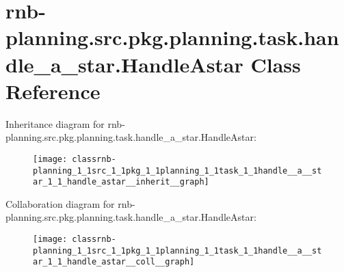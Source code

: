 \hypertarget{classrnb-planning_1_1src_1_1pkg_1_1planning_1_1task_1_1handle__a__star_1_1_handle_astar}{}\section{rnb-\/planning.src.\+pkg.\+planning.\+task.\+handle\+\_\+a\+\_\+star.\+Handle\+Astar Class Reference}
\label{classrnb-planning_1_1src_1_1pkg_1_1planning_1_1task_1_1handle__a__star_1_1_handle_astar}


Inheritance diagram for rnb-\/planning.src.\+pkg.\+planning.\+task.\+handle\+\_\+a\+\_\+star.\+Handle\+Astar\+:\nopagebreak
\begin{figure}[H]
\begin{center}
\leavevmode
\texttt{[image: classrnb-planning\_1\_1src\_1\_1pkg\_1\_1planning\_1\_1task\_1\_1handle\_\_a\_\_star\_1\_1\_handle\_astar\_\_inherit\_\_graph]}
\end{center}
\end{figure}


Collaboration diagram for rnb-\/planning.src.\+pkg.\+planning.\+task.\+handle\+\_\+a\+\_\+star.\+Handle\+Astar\+:\nopagebreak
\begin{figure}[H]
\begin{center}
\leavevmode
\texttt{[image: classrnb-planning\_1\_1src\_1\_1pkg\_1\_1planning\_1\_1task\_1\_1handle\_\_a\_\_star\_1\_1\_handle\_astar\_\_coll\_\_graph]}
\end{center}
\end{figure}
